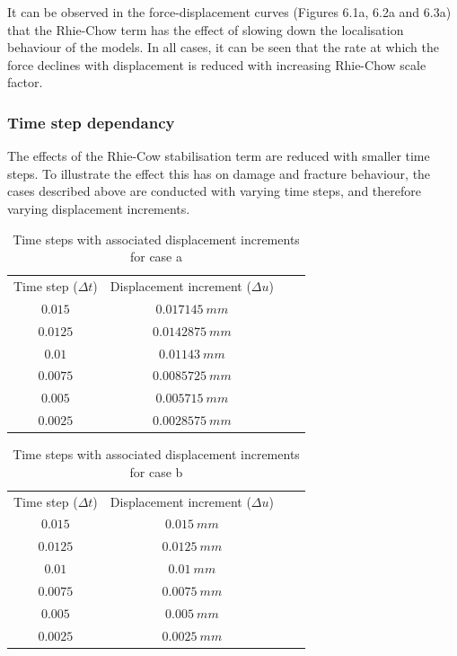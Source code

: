 \documentclass[sn-mathphys,Numbered,draft]{sn-jnl}%
\begin{document}
It can be observed in the force-displacement curves (Figures 6.1a, 6.2a and 6.3a) that the Rhie-Chow term has the effect of slowing down the localisation behaviour of the models. In all cases, it can be seen that the rate at which the force declines with displacement is reduced with increasing Rhie-Chow scale factor. 

\subsubsection{Time step dependancy}

The effects of the Rhie-Cow stabilisation term are reduced with smaller time steps. To illustrate the effect this has on damage and fracture behaviour, the cases described above are conducted with varying time steps, and therefore varying displacement increments.

\begin{table}[htb]
	\centering
		\begin{tabular}{cccc} \hline
		    Time step ($\Delta t$) & Displacement increment ($\Delta u$) \\
		    $0.015$ &  $0.017145\ mm$ \\
		    $0.0125$ &  $0.0142875\ mm$ \\
		    $0.01$ &  $0.01143 \ mm$ \\
		    $0.0075$ &  $0.0085725 \ mm$ \\
		    $0.005$ &  $0.005715 \ mm$ \\
		    $0.0025$ &  $0.0028575 \ mm$ \\
			\hline
		\end{tabular}
	\caption{Time steps with associated displacement increments for case a}
	\label{tab:material_properties}
\end{table}

\begin{table}[htb]
	\centering
		\begin{tabular}{cccc} \hline
		    Time step ($\Delta t$) & Displacement increment ($\Delta u$) \\
		    $0.015$ &  $0.015\ mm$ \\
		    $0.0125$ &  $0.0125\ mm$ \\
		    $0.01$ &  $0.01 \ mm$ \\
		    $0.0075$ &  $0.0075 \ mm$ \\
		    $0.005$ &  $0.005 \ mm$ \\
		    $0.0025$ &  $0.0025 \ mm$ \\
			\hline
		\end{tabular}
	\caption{Time steps with associated displacement increments for case b}
	\label{tab:material_properties}
\end{table}
\end{document}
